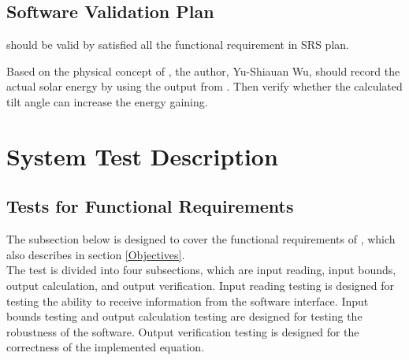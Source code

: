 \documentclass[12pt, titlepage]{article}
\begin{document}
 



\subsection{Software Validation Plan}

\progname{} should be valid by satisfied all the functional requirement in SRS 
plan.

Based on the physical concept of \progname, the author, Yu-Shiauan Wu, should
record the actual solar energy by using the output from \progname. Then verify
whether the calculated tilt angle can increase the energy gaining.



\section{System Test Description}\label{STD}	
\subsection{Tests for Functional Requirements}

The subsection below is designed to cover the functional requirements of
\progname, which also describes in section \ref{Objectives}.\\
The test is divided into four subsections, which are input reading, input
bounds,
output calculation, and output verification. Input reading testing is designed
for
testing the ability to receive information from the software interface. Input
bounds
testing and output calculation testing are designed for testing the robustness
of the
software. Output verification testing is designed for the correctness of the 
implemented equation.

 
\end{document}
